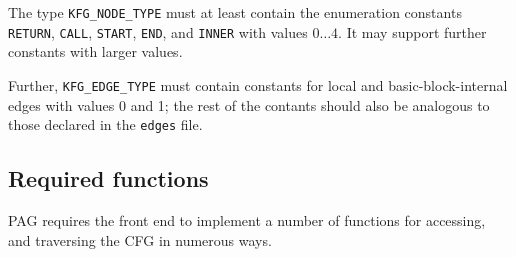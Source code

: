 \documentclass[12pt]{article}
\begin{document}
The type \verb|KFG_NODE_TYPE| must at least contain the enumeration
constants \verb|RETURN|, \verb|CALL|, \verb|START|, \verb|END|, and
\verb|INNER| with values \(0\ldots4\). It may support further
constants with larger values.

Further, \verb|KFG_EDGE_TYPE| must contain constants for local and
basic-block-internal edges with values 0 and 1; the rest of the
contants should also be analogous to those declared in the
\verb|edges| file.

\subsection{Required functions}

PAG requires the front end to implement a number of functions for
accessing, and traversing the CFG in numerous ways.
\end{document}

